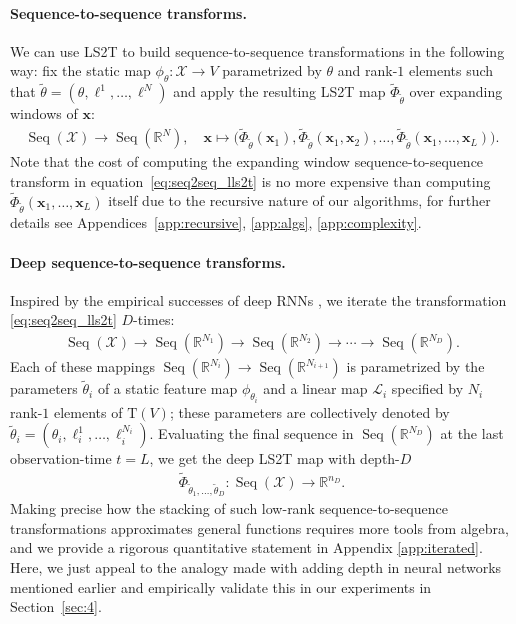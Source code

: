 \documentclass{article} \usepackage{iclr2021_conference,times}
\def\eqref#1{equation~\ref{#1}}
\newcommand{\R}{\mathbb{R}}
\newcommand{\bx}{\mathbf{x}}
\newcommand{\cX}{\mathcal{X}}
\newcommand{\cL}{\mathcal{L}}
\newcommand{\T}[1]{\mathrm{T}({#1})}
\newcommand{\Seq}[1]{\operatorname{Seq}(#1)}
\theoremstyle{plain}
\theoremstyle{definition}
\begin{document}
\paragraph{Sequence-to-sequence transforms.}
We can use LS2T to build sequence-to-sequence transformations in the following way: fix the static map $\phi_{\theta}: \cX \to V$ parametrized by $\theta$ and rank-$1$ elements such that $\tilde\theta = (\theta, \ell^1, \dots, \ell^N)$ and apply the resulting LS2T map $\tilde\Phi_{\tilde \theta}$ over expanding windows of $\bx$:
\begin{align} \label{eq:seq2seq_lls2t}
	\Seq{\cX} \to \Seq{\R^N},\quad \bx \mapsto \big(\tilde\Phi_{\tilde\theta}(\bx_1), \tilde\Phi_{\tilde\theta}(\bx_1, \bx_2), \dots, \tilde\Phi_{\tilde\theta}(\bx_1, \dots, \bx_L)\big).
\end{align}
Note that the cost of computing the expanding window sequence-to-sequence transform in \eqref{eq:seq2seq_lls2t} is no more expensive than computing $\tilde\Phi_{\tilde\theta}(\bx_1, \dots, \bx_L)$ itself due to the recursive nature of our algorithms, for further details see Appendices~\ref{app:recursive}, \ref{app:algs}, \ref{app:complexity}.

\paragraph{Deep sequence-to-sequence transforms.}
Inspired by the empirical successes of deep RNNs \citep{graves2013speech, graves2013hybrid, Sutskever2014Seq2Seq}, we iterate the transformation \ref{eq:seq2seq_lls2t} $D$-times:
\begin{align}\label{eq:stacked seq2seq}
  \Seq{\cX} \rightarrow \Seq{\R^{N_1}} \rightarrow \Seq{\R^{N_2}} \rightarrow \cdots \rightarrow \Seq{\R^{N_D}}. \end{align}
Each of these mappings $\Seq{\R^{N_i}} \rightarrow \Seq{\R^{N_{i+1}}}$ is parametrized by the parameters $\tilde\theta_i$ of a static feature map $\phi_{\theta_i}$ and a linear map $\cL_i$ specified by $N_i$ rank-$1$ elements of $\T{V}$; these parameters are collectively denoted by $\tilde\theta_i= (\theta_i, \ell_i^1, \dots, \ell_i^{N_i})$. 
Evaluating the final sequence in $\Seq{\R^{N_D}}$ at the last observation-time $t=L$, we get the deep LS2T map with depth-$D$
\begin{align}\label{eq:SeqFeatures}
  \tilde\Phi_{\tilde \theta_1,\ldots,\tilde \theta_{D}}:\Seq{\cX} \rightarrow \R^{n_D}.
\end{align}
Making precise how the stacking of such low-rank sequence-to-sequence transformations approximates general functions requires more tools from algebra, and we provide a rigorous quantitative statement in Appendix \ref{app:iterated}. 
Here, we just appeal to the analogy made with adding depth in neural networks mentioned earlier and empirically validate this in our experiments in Section~\ref{sec:4}. 
\end{document}
